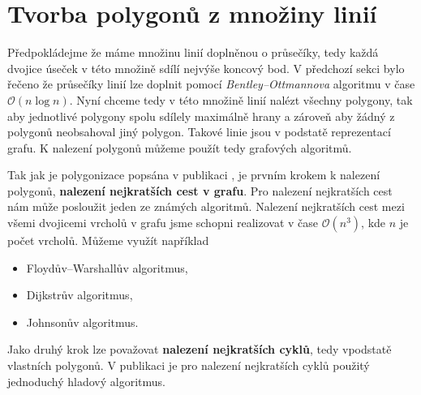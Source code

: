 \section{Tvorba polygonů z množiny linií}
Předpokládejme že máme množinu linií doplněnou o průsečíky, tedy každá dvojice úseček v této množině sdílí nejvýše koncový bod. V předchozí sekci bylo řečeno že průsečíky linií lze doplnit pomocí \textit{Bentley–Ottmannova} algoritmu v čase $\mathcal{O}(n\log{}n)$. Nyní chceme tedy v této množině linií nalézt všechny polygony, tak aby jednotlivé polygony spolu sdílely maximálně hrany a zároveň aby žádný z polygonů neobsahoval jiný polygon. Takové linie jsou v podstatě reprezentací grafu. K nalezení polygonů můžeme použít tedy grafových algoritmů. 

	Tak jak je polygonizace popsána v publikaci \cite{joaquim2003polygon}, je prvním krokem k nalezení polygonů, \textbf{nalezení nejkratších cest v grafu}. Pro nalezení nejkratších cest nám může posloužit jeden ze známých algoritmů. Nalezení nejkratších cest mezi všemi dvojicemi vrcholů v grafu jsme schopni realizovat v čase $\mathcal{O}(n^3)$, kde $n$ je počet vrcholů. Můžeme využít například 
	
\begin{itemize}
\item Floydův–Warshallův algoritmus,
\item Dijkstrův algoritmus,
\item Johnsonův algoritmus.
\end{itemize}
	
	Jako druhý krok lze považovat \textbf{nalezení nejkratších cyklů}, tedy vpodstatě vlastních polygonů. V publikaci \cite{joaquim2003polygon} je pro nalezení nejkratších cyklů použitý jednoduchý hladový algoritmus.
